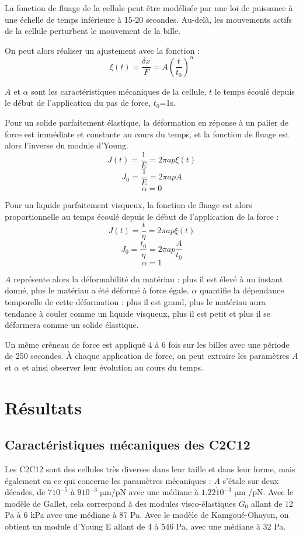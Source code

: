 \documentclass{report}
\newcommand{\micro}{$\mathrm{\mu}$}
\begin{document}
	 
La fonction de fluage de la cellule peut être modélisée par une loi de puissance à une échelle de temps inférieure à 15-20 secondes. Au-delà, les mouvements actifs de la cellule perturbent le mouvement de la bille. 

On peut alors réaliser un ajustement avec la fonction : 
$$ \xi (t) = \frac{\delta x}{F}=A \left( \frac{t}{t_0} \right)^{\alpha}$$

$A$ et $\alpha$ sont les caractéristiques mécaniques de la cellule, $t$ le temps écoulé depuis le début de l'application du pas de force, $t_0$=1s. 

Pour un solide parfaitement élastique, la déformation en réponse à un palier de force est immédiate et constante au cours du temps, et la fonction de fluage est alors l'inverse du module d'Young.
$$J(t)=\frac{1}{E} = 2 \pi a p \xi(t)$$
 $$J_0=\frac{1}{E} = 2 \pi a p A$$
 $$\alpha=0$$
 
 Pour un liquide parfaitement visqueux, la fonction de fluage est alors  proportionnelle au temps écoulé depuis le début de l'application de la force : 
 $$ J(t)=\frac{t}{\eta} = 2 \pi a p \xi(t)$$
 $$J_0=\frac{t_0}{\eta} = 2 \pi a p \frac{A}{t_0}$$
 $$\alpha=1$$
 
 $A$ représente alors la déformabilité du matériau : plus il est élevé à un instant donné, plus le matériau a été déformé à force égale. 
 $\alpha$ quantifie la dépendance temporelle de cette déformation : plus il est grand, plus le matériau aura tendance à couler comme un liquide visqueux, plus il est petit et plus il se déformera comme un solide élastique. 

Un même créneau de force est appliqué 4 à 6 fois sur les billes avec une période de 250 secondes. 
À chaque application de force, on peut extraire les paramètres $A$ et $\alpha$ et ainsi observer leur évolution au cours du temps. 


\section{Résultats}



\subsection{Caractéristiques mécaniques des C2C12}

Les C2C12 sont des cellules très diverses dans leur taille et dans leur forme, mais également en ce qui concerne les paramètres mécaniques : $A$ s'étale sur deux décades, de $7\dot 10^{-5}$ à $9\dot 10^{-3}$ \micro m/pN avec une médiane à $1.22 \dot 10^{-3}$ \micro m /pN.  Avec le modèle de Gallet, cela correspond à des modules visco-élastiques $G_0$ allant de 12 Pa à 6 kPa avec une médiane à 87 Pa. 
Avec le modèle de Kamgoué-Ohayon, on obtient un module d'Young E allant de 4 à 546 Pa, avec une médiane à 32 Pa. 
\end{document}

